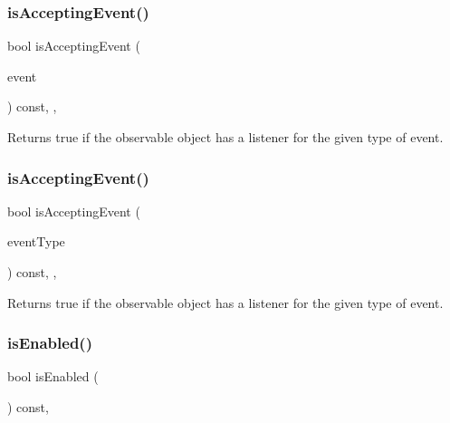 \subsubsection{\texorpdfstring{is\+Accepting\+Event()}{isAcceptingEvent()}\hspace{0.1cm}{\footnotesize\ttfamily [2/3]}}
{\footnotesize\ttfamily bool is\+Accepting\+Event (\begin{DoxyParamCaption}\item[{const \mbox{\hyperlink{classsgl_1_1GEvent}{G\+Event}} \&}]{event }\end{DoxyParamCaption}) const\hspace{0.3cm}{\ttfamily [protected]}, {\ttfamily [virtual]}, {\ttfamily [inherited]}}



Returns true if the observable object has a listener for the given type of event. 

\mbox{\label{classsgl_1_1GObservable_a3b1c689267eda44e65a2213e7de38b23}} 
\subsubsection{\texorpdfstring{is\+Accepting\+Event()}{isAcceptingEvent()}\hspace{0.1cm}{\footnotesize\ttfamily [3/3]}}
{\footnotesize\ttfamily bool is\+Accepting\+Event (\begin{DoxyParamCaption}\item[{const std\+::string \&}]{event\+Type }\end{DoxyParamCaption}) const\hspace{0.3cm}{\ttfamily [protected]}, {\ttfamily [virtual]}, {\ttfamily [inherited]}}



Returns true if the observable object has a listener for the given type of event. 

\mbox{\label{classsgl_1_1GInteractor_aacb819fb241851fd9fc045271baa4034}} 
\subsubsection{\texorpdfstring{is\+Enabled()}{isEnabled()}}
{\footnotesize\ttfamily bool is\+Enabled (\begin{DoxyParamCaption}{ }\end{DoxyParamCaption}) const\hspace{0.3cm}{\ttfamily [virtual]}, {\ttfamily [inherited]}}



